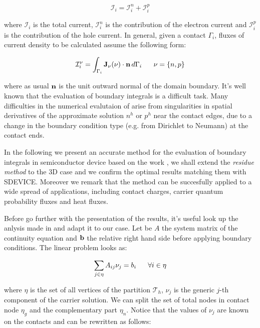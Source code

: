 \begin{equation}
\mathcal{I}_i = \mathcal{I}_i^n + \mathcal{I}_i^p
\end{equation}

where $\mathcal{I}_i$ is the total current, $\mathcal{I}_i^n$ is the contribution of the electron current and $\mathcal{I}_i^p$ is the contribution of the hole current.
In general, given a contact $\Gamma_i$, fluxes of current density to be calculated assume the following form:

\begin{equation}
\label{eq: current flux}
\mathcal{I}_i^\nu = \int_{\Gamma_i}\vect{J}_\nu(\nu) \cdot \vect{n} \, d{\Gamma_i} \psp{10} \nu = \{n,p\}
\end{equation}

where as usual $\mathbf{n}$ is the unit outward normal of the domain boundary. It's well known that the evaluation of boundary integrals is a difficult task. Many difficulties in the numerical evalutaion of  arise from singularities in spatial derivatives of the approximate solution $n^h$ or $p^h$ near the contact edges, due to a change in the boundary condition type (e.g. from Dirichlet to Neumann) at the contact ends.

In the following we present an accurate method for the evaluation of boundary integrals in semiconductor device based on the work \cite{ContactCurrentRM}, we shall extend the \textit{residue method} to the 3D case and we confirm the optimal results matching them with SDEVICE. Moreover we remark that the method can be succesfully applied to a wide spread of applications, including contact charges, carrier quantum probability fluxes and heat fluxes.

Before go further with the presentation of the results, it's useful look up the anlysis made in \cite{ContactCurrentRM} and adapt it to our case. Let be $A$ the system matrix of the continuity equation  and $\mathbf{b}$ the relative right hand side before applying boundary conditions.  The linear problem looks as:

\begin{equation}
\label{eq: discretization before bc}
\sum_{j\in\eta} A_{ij} \nu_j = b_i \psp{10} \forall i \in \eta
\end{equation}

where $\eta$ is the set of all vertices of the partition $\mathcal{T}_h$, $\nu_j$ is the generic $j$-th component of the carrier solution.  We can split the set of total nodes in contact node $\eta_g$ and the complementary part $\eta_n$.
Notice that the values of $\nu_j$ are known on the contacts and  can be rewritten as follows:

